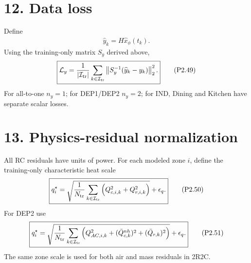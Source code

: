 \documentclass[11pt]{article}
\begin{document}
\section*{12. Data loss}
Define
\begin{align}
\widehat y_k=H\widehat x_\phi(t_k).
\end{align}
Using the training-only matrix \(S_y\) derived above,
\begin{align}
\boxed{\mathcal L_y=\frac{1}{|\mathcal I_{\rm tr}|}\sum_{k\in\mathcal I_{\rm tr}}\left\|S_y^{-1}(\widehat y_k-y_k)\right\|_2^2.}
\tag{P2.49}
\end{align}
For all-to-one \(n_y=1\); for DEP1/DEP2 \(n_y=2\); for IND, Dining and Kitchen have separate scalar losses.

\section*{13. Physics-residual normalization}
All RC residuals have units of power. For each modeled zone \(i\), define the training-only characteristic heat scale
\begin{align}
\boxed{q_i^\star=\sqrt{\frac{1}{N_{\rm tr}}\sum_{k\in\mathcal I_{\rm tr}}\left(Q_{c,i,k}^2+Q_{r,i,k}^2\right)}+\epsilon_q.}
\tag{P2.50}
\end{align}
For DEP2 use
\begin{align}
\boxed{q_i^\star=\sqrt{\frac{1}{N_{\rm tr}}\sum_{k\in\mathcal I_{\rm tr}}\left(Q_{AC,i,k}^2+(\bar Q_{c,k}^{nh})^2+(\bar Q_{r,k})^2\right)}+\epsilon_q.}
\tag{P2.51}
\end{align}
The same zone scale is used for both air and mass residuals in 2R2C.
\end{document}
